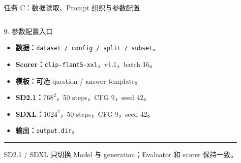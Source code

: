 \documentclass[aspectratio=169,10pt]{beamer}
\begin{document}
\begin{frame}{任务 C：数据读取、Prompt 组织与参数配置}
\begin{columns}[T,onlytextwidth]
      \begin{block}{9. 参数配置入口}
        \begin{minipage}[c][5.05cm][c]{\linewidth}
          \begin{itemize}\scriptsize
            \item \textbf{数据：}\texttt{dataset / config / split / subset}。
            \item \textbf{Scorer：}\texttt{clip-flant5-xxl}，v1.1，batch 16。
            \item \textbf{模板：}可选 question / answer template。
            \item \textbf{SD2.1：}$768^2$，50 steps，CFG 9，seed 42。
            \item \textbf{SDXL：}$1024^2$，50 steps，CFG 9，seed 42。
            \item \textbf{输出：}\texttt{output.dir}。
          \end{itemize}
          \vspace{0.45em}
          \color{T2IGray}\rule{\linewidth}{0.35pt}\par\vspace{0.3em}
          \scriptsize SD2.1 / SDXL 只切换 Model 与 generation；Evaluator 和 scorer 保持一致。
        \end{minipage}
      \end{block}
  \end{columns}
\end{frame}
\end{document}
